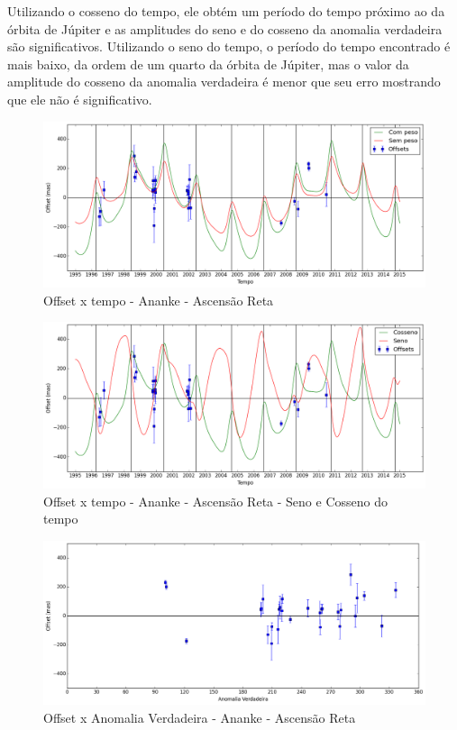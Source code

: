 \documentclass[11pt,a4paper]{report}
\begin{document}
Utilizando o cosseno do tempo, ele obtém um período do tempo próximo ao da órbita de Júpiter e as amplitudes do seno e do cosseno da anomalia verdadeira são significativos. Utilizando o seno do tempo, o período do tempo encontrado é mais baixo, da ordem de um quarto da órbita de Júpiter, mas o valor da amplitude do cosseno da anomalia verdadeira é menor que seu erro mostrando que ele não é significativo.

\begin{figure}[h]
\caption{Offset x tempo - Ananke - Ascensão Reta}
\includegraphics[scale=0.45]{Ananke/RA.png} 
\end{figure}

\begin{figure}[h]
\caption{Offset x tempo - Ananke - Ascensão Reta - Seno e Cosseno do tempo}
\includegraphics[scale=0.45]{Ananke/RA_cos_sen.png} 
\end{figure}

\begin{figure}[h]
\caption{Offset x Anomalia Verdadeira - Ananke - Ascensão Reta}
\includegraphics[scale=0.45]{Ananke/RA_anom.png}  
\end{figure}
\end{document}

